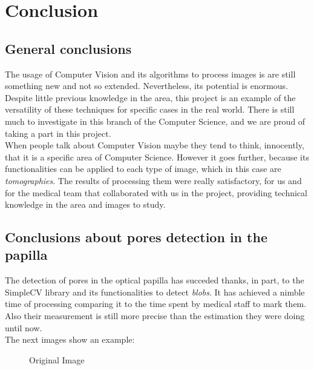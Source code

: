 \chapter{Conclusion}
\section{General conclusions}
The usage of Computer Vision and its algorithms to process images is are
still something new and not so extended. Nevertheless, its potential is
enormous. Despite little previous knowledge in the area, this project is an
example of the versatility of these techniques for specific cases in
the real world. There is still much to investigate in this branch
of the Computer Science, and we are proud of taking a part in this
project.\\
When people talk about Computer Vision maybe they tend to think,
innocently, that it is a specific area of Computer Science. However
it goes further, because its functionalities can be applied to each
type of image, which in this case are \emph{tomographies}.
The results of processing them were really satisfactory, for us and
for the medical team that collaborated with us in the project, 
providing technical knowledge in the area and images to study.

\section{Conclusions about pores detection in the papilla}
The detection of pores in the optical papilla has succeded thanks, in
part, to the SimpleCV library and its functionalities to detect 
\emph{blobs}. It has achieved a nimble time of processing comparing
it to the time spent by medical staff to mark them. Also their 
measurement is still more precise than the estimation they were doing
until now. \\
The next images show an example:

    \begin{figure}[H]
      \caption{Original Image}
      \centering \setlength\fboxsep{0pt} \setlength\fboxrule{0.5pt}
    \end{figure}

